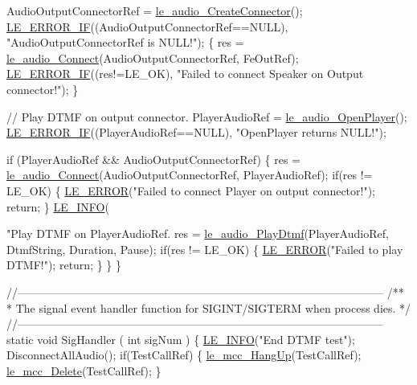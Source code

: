 \begin{DoxyCodeInclude}
{{{{{{{{{{{    AudioOutputConnectorRef = \hyperlink{le__audio__interface_8h_a570aaf85086f00aca592acfbaaa237be}{le\_audio\_CreateConnector}();
    \hyperlink{le__log_8h_aceaf11a11691d6c676e36dd317b38dbd}{LE\_ERROR\_IF}((AudioOutputConnectorRef==NULL), \textcolor{stringliteral}{"AudioOutputConnectorRef is NULL!"});
    \{
        res = \hyperlink{le__audio__interface_8h_a338df65b2fb1ae0140d86880adbcf0de}{le\_audio\_Connect}(AudioOutputConnectorRef, FeOutRef);
        \hyperlink{le__log_8h_aceaf11a11691d6c676e36dd317b38dbd}{LE\_ERROR\_IF}((res!=LE\_OK), \textcolor{stringliteral}{"Failed to connect Speaker on Output connector!"});
    \}

    \textcolor{comment}{// Play DTMF on output connector.}
    PlayerAudioRef = \hyperlink{le__audio__interface_8h_a92eb1b6377f50ff07b97c5b8546f01ec}{le\_audio\_OpenPlayer}();
    \hyperlink{le__log_8h_aceaf11a11691d6c676e36dd317b38dbd}{LE\_ERROR\_IF}((PlayerAudioRef==NULL), \textcolor{stringliteral}{"OpenPlayer returns NULL!"});

    \textcolor{keywordflow}{if} (PlayerAudioRef && AudioOutputConnectorRef)
    \{
        res = \hyperlink{le__audio__interface_8h_a338df65b2fb1ae0140d86880adbcf0de}{le\_audio\_Connect}(AudioOutputConnectorRef, PlayerAudioRef);
        \textcolor{keywordflow}{if}(res != LE\_OK)
        \{
            \hyperlink{le__log_8h_a353590f91b3143a7ba3a416ae5a50c3d}{LE\_ERROR}(\textcolor{stringliteral}{"Failed to connect Player on output connector!"});
            \textcolor{keywordflow}{return};
        \}
        \hyperlink{le__log_8h_a23e6d206faa64f612045d688cdde5808}{LE\_INFO}(\textcolor{stringliteral}{"Play DTMF on PlayerAudioRef.%
        res = \hyperlink{le__audio__interface_8h_ab9d062cda7010c3c97e0dfdc52f7470e}{le\_audio\_PlayDtmf}(PlayerAudioRef, DtmfString, Duration, Pause);
        \textcolor{keywordflow}{if}(res != LE\_OK)
        \{
            \hyperlink{le__log_8h_a353590f91b3143a7ba3a416ae5a50c3d}{LE\_ERROR}(\textcolor{stringliteral}{"Failed to play DTMF!"});
            \textcolor{keywordflow}{return};
        \}
    \}
\}


\textcolor{comment}{//--------------------------------------------------------------------------------------------------}\textcolor{comment}{}
\textcolor{comment}{/**}
\textcolor{comment}{ * The signal event handler function for SIGINT/SIGTERM when process dies.}
\textcolor{comment}{ */}
\textcolor{comment}{//--------------------------------------------------------------------------------------------------}
\textcolor{keyword}{static} \textcolor{keywordtype}{void} SigHandler
(
    \textcolor{keywordtype}{int} sigNum
)
\{
    \hyperlink{le__log_8h_a23e6d206faa64f612045d688cdde5808}{LE\_INFO}(\textcolor{stringliteral}{"End DTMF test"});
    DisconnectAllAudio();
    \textcolor{keywordflow}{if}(TestCallRef)
    \{
        \hyperlink{le__mcc__interface_8h_a7b9567715a3cd30c83a3b6886eeb2044}{le\_mcc\_HangUp}(TestCallRef);
        \hyperlink{le__mcc__interface_8h_a1a016e6443df2d3ee99113649f4f34ae}{le\_mcc\_Delete}(TestCallRef);
    \}

}}}}}}}}}}}}
\end{DoxyCodeInclude}
